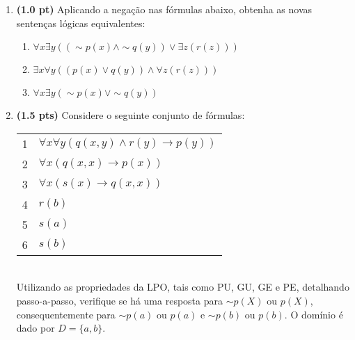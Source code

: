\documentclass[11pt, a4paper,final]{article}
\begin{document}
\begin{enumerate}
\item {\bf (1.0 pt)} Aplicando a negação nas fórmulas abaixo, obtenha
 as novas  sentenças lógicas equivalentes:
\begin{enumerate}
\setlength{\itemsep}{-2pt}
 \item $ \forall x \exists y ((\sim p(x) \wedge \sim q(y)) \vee \exists z (r(z)))$
 \item $ \exists x \forall y ((p(x) \vee q(y)) \wedge \forall z (r(z)))$
 \item $ \forall x \exists y (\sim p(x) \vee \sim q(y))$
\end{enumerate}


\item {\bf (1.5 pts)} Considere o seguinte conjunto de f\'ormulas: 

\begin{tabular}{ll}
1 &  $\forall x\forall y (q(x,y) \wedge r(y) \rightarrow p(y)) $ \\
2 &  $\forall x (q(x,x) \rightarrow p(x))  $ \\
3 &  $\forall x (s(x) \rightarrow q(x,x)) $ \\
4 &  $r(b)$ \\ 
5 &  $s(a)$ \\
6 &  $s(b)$ \\
\end{tabular}\\
Utilizando as propriedades da LPO, tais como PU, GU, GE e PE, detalhando passo-a-passo, verifique se há uma resposta para $\sim p(X)$ ou $p(X)$, 
consequentemente para $\sim p(a)$ ou $p(a)$ e $\sim p(b)$ ou $p(b)$.
O domínio é dado por $D=\{a,b\}$. 



\end{enumerate}
\end{document}
